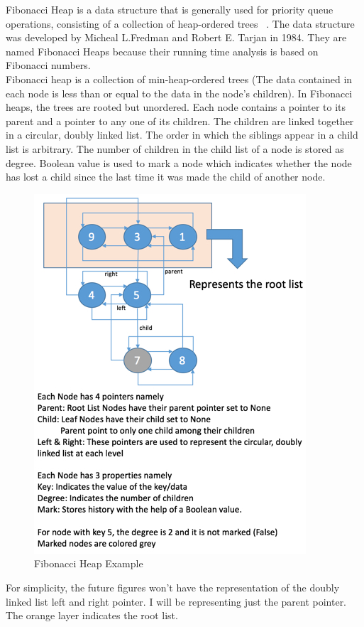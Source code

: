 Fibonacci Heap is a data structure that is generally used for priority queue operations, consisting of a collection of heap-ordered trees~\cite{wikiFiboHeap,cormen2009introduction} . The data structure was developed by Micheal L.Fredman and Robert E. Tarjan in 1984. They are named Fibonacci Heaps because their running time analysis is based on Fibonacci numbers. \\

Fibonacci heap is a collection of min-heap-ordered trees (The data contained in each node is less than or equal to the data  in the node's children). In Fibonacci heaps, the trees are rooted but unordered. Each node contains a pointer to its parent and a pointer to any one of its children. The children are linked together in a circular, doubly linked list. The order in which the siblings appear in a child list is arbitrary. The number of children in the child list of a node is stored as degree. Boolean value is used to mark a node which indicates whether  the node has lost a child since the last time it was made the child of another node.\\

\begin{figure}
	\includegraphics[width=0.95\columnwidth]{Figures/FibonacciHeap}
	\caption{Fibonacci Heap Example}
\end{figure}

For simplicity, the future figures won't have the representation of the doubly linked list left and right pointer. I will be representing just the parent pointer. The orange layer indicates the root list.



